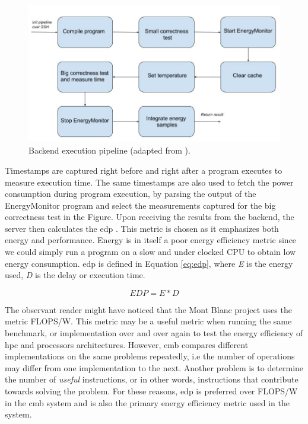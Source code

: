 \begin{figure}
  \includegraphics[width=1.0\textwidth]{figs/execution_pipeline.jpg}
  \caption[Backend execution pipeline.]{Backend execution pipeline (adapted from \cite{mt:T&S}).}
  \label{fig:execution-pipeline}
\end{figure}

Timestamps are captured right before and right after a program executes to measure execution time. The same timestamps are also used to fetch the power consumption during program execution, by parsing the output of the EnergyMonitor program and select the measurements captured for the big correctness test in the Figure. Upon receiving the results from the backend, the server then calculates the \gls{edp} \cite{a:edp}. This metric is chosen as it emphasizes both energy and performance. Energy is in itself a poor energy efficiency metric since we could simply run a program on a slow and under clocked CPU to obtain low energy consumption. \gls{edp} is defined in Equation \ref{eq:edp}, where \textit{E} is the energy used, \textit{D} is the delay or execution time.

\begin{equation}
  \label{eq:edp}
  EDP = E * D
\end{equation}

The observant reader might have noticed that the Mont Blanc project uses the metric FLOPS/W. This metric may be a useful metric when running the same benchmark, or implementation over and over again to test the energy efficiency of \gls{hpc} and processors architectures. However, \gls{cmb} compares different implementations on the same problems repeatedly, i.e the number of operations may differ from one implementation to the next. Another problem is to determine the number of \textit{useful} instructions, or in other words, instructions that contribute towards solving the problem. For these reasons, \gls{edp} is preferred over FLOPS/W in the \gls{cmb} system and is also the primary energy efficiency metric used in the system.

